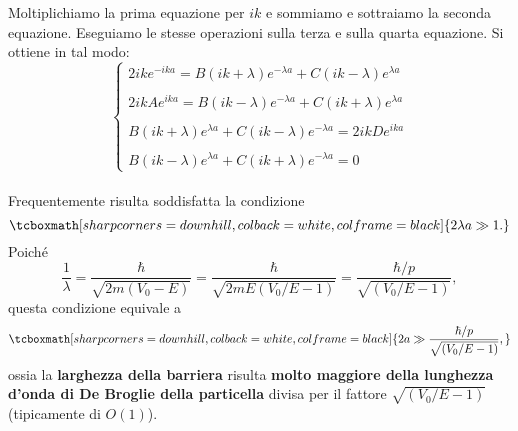 \documentclass[a4paper,12pt,oneside]{book}
\begin{document}
Moltiplichiamo la prima equazione per $ik$ e sommiamo e sottraiamo la seconda equazione. Eseguiamo le stesse operazioni sulla terza e sulla quarta equazione. Si ottiene in tal modo:
	\begin{equation}
		\begin{cases}
		\displaystyle{2ike^{-ika}= B \left(ik+\lambda\right)e^{-\lambda a} +C \left(ik-\lambda\right)e^{\lambda a} }\\
		\\
		\displaystyle{2ikAe^{ika}= B \left(ik-\lambda\right)e^{-\lambda a} +C \left(ik+\lambda\right)e^{\lambda a} }\\
		\\
		\displaystyle{B\left(ik+\lambda\right)e^{\lambda a} + C\left(ik-\lambda\right)e^{-\lambda a} = 2ikD e^{ika}}\\
		\\
		\displaystyle{B\left(ik-\lambda\right)e^{\lambda a} + C\left(ik+\lambda\right)e^{-\lambda a} =0}
		\end{cases}
	\label{eq:cap10_10}
	\end{equation}\\

Frequentemente risulta soddisfatta la condizione
	\begin{equation}
		\tcboxmath[sharp corners=downhill, colback=white, colframe=black]{
			2\lambda a \gg 1.
			}
	\end{equation}
Poiché
	\begin{equation}
		\frac{1}{\lambda}=\frac{\hbar}{\sqrt{2m\left(V_0 - E \right)}}=\frac{\hbar}{\sqrt{2mE\left(V_0/E - 1 \right)}}=\frac{\hbar /p}{\sqrt{\left(V_0/E - 1 \right)}},
	\end{equation}
questa condizione equivale a
	\begin{equation}
		\tcboxmath[sharp corners=downhill, colback=white, colframe=black]{
			2a \gg \frac{\hbar /p}{\sqrt{\left(V_0/E - 1 \right)}},
			}
	\end{equation}
ossia la \textbf{larghezza della barriera} risulta \textbf{molto maggiore della lunghezza d'onda di De Broglie della particella} divisa per il fattore $\sqrt{\left(V_0/E - 1 \right)}$ (tipicamente di $O(1)$).\\
\end{document}
